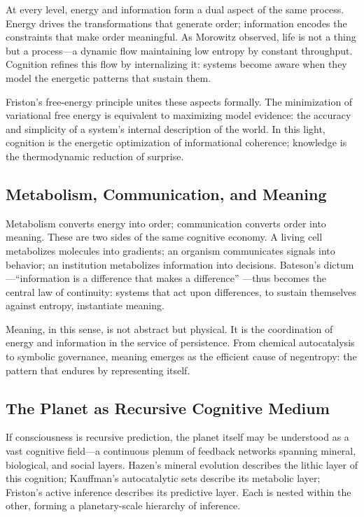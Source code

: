 \documentclass[11pt,a4paper]{article}
\begin{document}
At every level, energy and information form a dual aspect of the same process.  Energy drives the transformations that generate order; information encodes the constraints that make order meaningful.  As Morowitz \citep{Morowitz1968EnergyFlowBiology} observed, life is not a thing but a process—a dynamic flow maintaining low entropy by constant throughput.  Cognition refines this flow by internalizing it: systems become aware when they model the energetic patterns that sustain them.

Friston’s free-energy principle unites these aspects formally.  The minimization of variational free energy is equivalent to maximizing model evidence: the accuracy and simplicity of a system’s internal description of the world.  In this light, cognition is the energetic optimization of informational coherence; knowledge is the thermodynamic reduction of surprise.

\subsection{Metabolism, Communication, and Meaning}

Metabolism converts energy into order; communication converts order into meaning.  These are two sides of the same cognitive economy.  A living cell metabolizes molecules into gradients; an organism communicates signals into behavior; an institution metabolizes information into decisions.  Bateson’s dictum—“information is a difference that makes a difference” \citep{Bateson1972StepsToAnEcologyOfMind}—thus becomes the central law of continuity: systems that act upon differences, to sustain themselves against entropy, instantiate meaning.

Meaning, in this sense, is not abstract but physical.  It is the coordination of energy and information in the service of persistence.  From chemical autocatalysis to symbolic governance, meaning emerges as the efficient cause of negentropy: the pattern that endures by representing itself.

\subsection{The Planet as Recursive Cognitive Medium}

If consciousness is recursive prediction, the planet itself may be understood as a vast cognitive field—a continuous plenum of feedback networks spanning mineral, biological, and social layers.  Hazen’s mineral evolution describes the lithic layer of this cognition; Kauffman’s autocatalytic sets describe its metabolic layer; Friston’s active inference describes its predictive layer.  Each is nested within the other, forming a planetary-scale hierarchy of inference.
\end{document}
